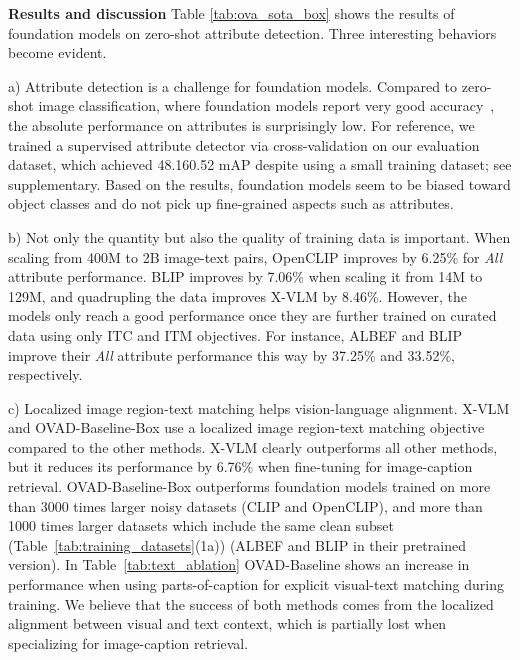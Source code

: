 \documentclass[10pt,twocolumn,letterpaper]{article}
\renewcommand\paragraph[1]{\vspace{0.12cm}\noindent\textbf{#1}}
\newcommand{\modelname}{OVAD-Baseline }
\newcommand{\modelnamenospace}{OVAD-Baseline}
\begin{document}
%
 
\paragraph{Results and discussion}
Table \ref{tab:ova_sota_box} shows the results of foundation models on zero-shot attribute detection. Three interesting behaviors become evident. 

a) Attribute detection is a challenge for foundation models. Compared to zero-shot image classification, where foundation models report very good accuracy~\cite{blip, albef, xvlm, clip, open_clip}, the absolute performance on attributes is surprisingly low. For reference, we trained a supervised attribute detector via cross-validation on our evaluation dataset, which achieved 48.16{\small0.52} mAP despite using a small training dataset; see supplementary. Based on the results, foundation models seem to be biased toward object classes and do not pick up fine-grained aspects such as attributes.

b) Not only the quantity but also the quality of training data is important. When scaling from 400M to 2B image-text pairs, OpenCLIP improves by 6.25\% for \textit{All} attribute performance. BLIP improves by 7.06\% when scaling it from 14M to 129M, and quadrupling the data improves X-VLM by 8.46\%. However, the models only reach a good performance once they are further trained on curated data using only ITC and ITM objectives. For instance, ALBEF and BLIP improve their \textit{All} attribute performance this way by 37.25\% and 33.52\%, respectively. 

c)  Localized image region-text matching helps vision-language alignment. X-VLM and \modelnamenospace{}-Box use a localized image region-text matching objective compared to the other methods. X-VLM clearly outperforms all other methods, but it reduces its performance by 6.76\%  when fine-tuning for image-caption retrieval. \modelnamenospace{}-Box outperforms foundation models trained on more than 3000 times larger noisy datasets (CLIP and OpenCLIP), and more than 1000 times larger datasets which include the same clean subset (Table~\ref{tab:training_datasets}(1a)) (ALBEF and BLIP in their pretrained version). In Table~\ref{tab:text_ablation} \modelname shows an increase in performance when using parts-of-caption for explicit visual-text matching during training. We believe that the success of both methods comes from the localized alignment between visual and text context, which is partially lost when specializing for image-caption retrieval. 
\end{document}

